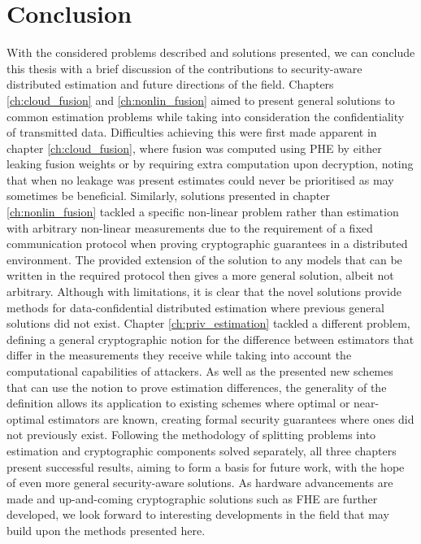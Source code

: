 
\chapter{Conclusion}\label{ch:conclusion}
With the considered problems described and solutions presented, we can conclude this thesis with a brief discussion of the contributions to security-aware distributed estimation and future directions of the field. Chapters \ref{ch:cloud_fusion} and \ref{ch:nonlin_fusion} aimed to present general solutions to common estimation problems while taking into consideration the confidentiality of transmitted data. Difficulties achieving this were first made apparent in chapter \ref{ch:cloud_fusion}, where fusion was computed using PHE by either leaking fusion weights or by requiring extra computation upon decryption, noting that when no leakage was present estimates could never be prioritised as may sometimes be beneficial. Similarly, solutions presented in chapter \ref{ch:nonlin_fusion} tackled a specific non-linear problem rather than estimation with arbitrary non-linear measurements due to the requirement of a fixed communication protocol when proving cryptographic guarantees in a distributed environment. The provided extension of the solution to any models that can be written in the required protocol then gives a more general solution, albeit not arbitrary. Although with limitations, it is clear that the novel solutions provide methods for data-confidential distributed estimation where previous general solutions did not exist. Chapter \ref{ch:priv_estimation} tackled a different problem, defining a general cryptographic notion for the difference between estimators that differ in the measurements they receive while taking into account the computational capabilities of attackers. As well as the presented new schemes that can use the notion to prove estimation differences, the generality of the definition allows its application to existing schemes where optimal or near-optimal estimators are known, creating formal security guarantees where ones did not previously exist. Following the methodology of splitting problems into estimation and cryptographic components solved separately, all three chapters present successful results, aiming to form a basis for future work, with the hope of even more general security-aware solutions. As hardware advancements are made and up-and-coming cryptographic solutions such as FHE are further developed, we look forward to interesting developments in the field that may build upon the methods presented here.
